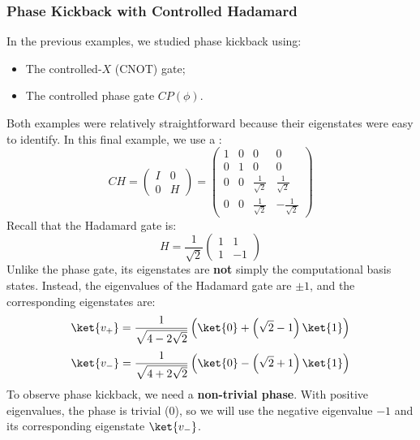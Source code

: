 \subsubsection{Phase Kickback with Controlled Hadamard}\label{ex:phase-kickback-with-controlled-hadamard}

In the previous examples, we studied phase kickback using:
\begin{itemize}
    \item The controlled-$X$ (CNOT) gate;
    \item The controlled phase gate $CP(\phi)$.
\end{itemize}
Both examples were relatively straightforward because their eigenstates were easy to identify. In this final example, we use a :
\begin{equation}
    CH = \begin{pmatrix}
        I & 0 \\
        0 & H
    \end{pmatrix} =
    \begin{pmatrix}
        1 & 0 & 0 & 0 \\
        0 & 1 & 0 & 0 \\
        0 & 0 & \frac{1}{\sqrt{2}} & \frac{1}{\sqrt{2}} \\
        0 & 0 & \frac{1}{\sqrt{2}} & -\frac{1}{\sqrt{2}}
    \end{pmatrix}
\end{equation}
Recall that the Hadamard gate is:
\begin{equation*}
    H = \frac{1}{\sqrt{2}}\begin{pmatrix}
        1 & 1 \\
        1 & -1
    \end{pmatrix}
\end{equation*}
Unlike the phase gate, its eigenstates are \textbf{not} simply the computational basis states. Instead, the eigenvalues of the Hadamard gate are $\pm 1$, and the corresponding eigenstates are:
\begin{equation*}
    \ket{v_+} = \frac{1}{\sqrt{4-2\sqrt{2}}} \left(\ket{0} + \left(\sqrt{2} - 1\right)\ket{1}\right)
\end{equation*}
\begin{equation*}
    \ket{v_-} = \frac{1}{\sqrt{4+2\sqrt{2}}} \left(\ket{0} - \left(\sqrt{2} + 1\right)\ket{1}\right)
\end{equation*}
To observe phase kickback, we need a \textbf{non-trivial phase}. With positive eigenvalues, the phase is trivial (0), so we will use the negative eigenvalue $-1$ and its corresponding eigenstate $\ket{v_-}$.

